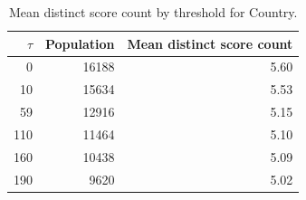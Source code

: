 \begin{table}[htbp]
\centering
\small
\begin{tabular}{r r r}
\hline
$\tau$ & Population & Mean distinct score count \\
\hline
0 & 16188 & 5.60 \\
10 & 15634 & 5.53 \\
59 & 12916 & 5.15 \\
110 & 11464 & 5.10 \\
160 & 10438 & 5.09 \\
190 & 9620 & 5.02 \\
\hline
\end{tabular}
\caption{Mean distinct score count by threshold for Country.}
\label{tab:mean-size-Country}
\end{table}
